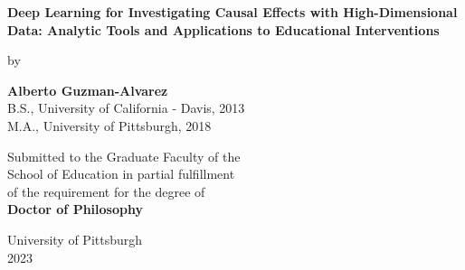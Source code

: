 
   \begin{center}
   \begin{spacing}{2}

        \textbf{Deep Learning for Investigating Causal Effects with High-Dimensional Data: Analytic Tools and Applications to Educational Interventions}
            
        \vspace{1.5cm}
        \vfill
        by
            
        \textbf{Alberto Guzman-Alvarez}\\
        B.S., University of California - Davis, 2013\\
        M.A., University of Pittsburgh, 2018\\
        
        \vfill
        
        Submitted to the Graduate Faculty of the\\
        School of Education in partial fulfillment\\
        of the requirement for the degree of\\
        \textbf{Doctor of Philosophy}
            
        \vfill
            
        \vspace{0.8cm}
        
        \vspace{0.8cm}
        
        University of Pittsburgh\\ 
        2023
    \end{spacing}        
    \end{center}

	
	